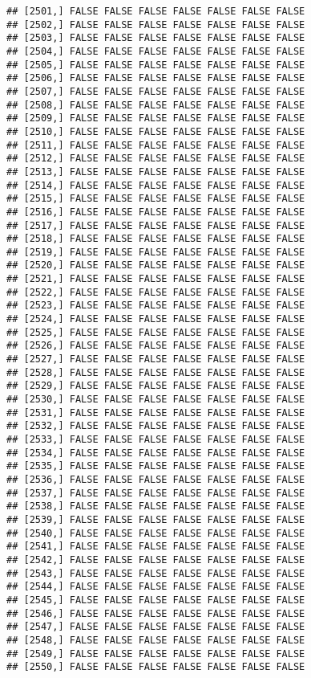\documentclass[
]{article}
\begin{document}
\begin{verbatim}
## [2501,] FALSE FALSE FALSE FALSE FALSE FALSE FALSE
## [2502,] FALSE FALSE FALSE FALSE FALSE FALSE FALSE
## [2503,] FALSE FALSE FALSE FALSE FALSE FALSE FALSE
## [2504,] FALSE FALSE FALSE FALSE FALSE FALSE FALSE
## [2505,] FALSE FALSE FALSE FALSE FALSE FALSE FALSE
## [2506,] FALSE FALSE FALSE FALSE FALSE FALSE FALSE
## [2507,] FALSE FALSE FALSE FALSE FALSE FALSE FALSE
## [2508,] FALSE FALSE FALSE FALSE FALSE FALSE FALSE
## [2509,] FALSE FALSE FALSE FALSE FALSE FALSE FALSE
## [2510,] FALSE FALSE FALSE FALSE FALSE FALSE FALSE
## [2511,] FALSE FALSE FALSE FALSE FALSE FALSE FALSE
## [2512,] FALSE FALSE FALSE FALSE FALSE FALSE FALSE
## [2513,] FALSE FALSE FALSE FALSE FALSE FALSE FALSE
## [2514,] FALSE FALSE FALSE FALSE FALSE FALSE FALSE
## [2515,] FALSE FALSE FALSE FALSE FALSE FALSE FALSE
## [2516,] FALSE FALSE FALSE FALSE FALSE FALSE FALSE
## [2517,] FALSE FALSE FALSE FALSE FALSE FALSE FALSE
## [2518,] FALSE FALSE FALSE FALSE FALSE FALSE FALSE
## [2519,] FALSE FALSE FALSE FALSE FALSE FALSE FALSE
## [2520,] FALSE FALSE FALSE FALSE FALSE FALSE FALSE
## [2521,] FALSE FALSE FALSE FALSE FALSE FALSE FALSE
## [2522,] FALSE FALSE FALSE FALSE FALSE FALSE FALSE
## [2523,] FALSE FALSE FALSE FALSE FALSE FALSE FALSE
## [2524,] FALSE FALSE FALSE FALSE FALSE FALSE FALSE
## [2525,] FALSE FALSE FALSE FALSE FALSE FALSE FALSE
## [2526,] FALSE FALSE FALSE FALSE FALSE FALSE FALSE
## [2527,] FALSE FALSE FALSE FALSE FALSE FALSE FALSE
## [2528,] FALSE FALSE FALSE FALSE FALSE FALSE FALSE
## [2529,] FALSE FALSE FALSE FALSE FALSE FALSE FALSE
## [2530,] FALSE FALSE FALSE FALSE FALSE FALSE FALSE
## [2531,] FALSE FALSE FALSE FALSE FALSE FALSE FALSE
## [2532,] FALSE FALSE FALSE FALSE FALSE FALSE FALSE
## [2533,] FALSE FALSE FALSE FALSE FALSE FALSE FALSE
## [2534,] FALSE FALSE FALSE FALSE FALSE FALSE FALSE
## [2535,] FALSE FALSE FALSE FALSE FALSE FALSE FALSE
## [2536,] FALSE FALSE FALSE FALSE FALSE FALSE FALSE
## [2537,] FALSE FALSE FALSE FALSE FALSE FALSE FALSE
## [2538,] FALSE FALSE FALSE FALSE FALSE FALSE FALSE
## [2539,] FALSE FALSE FALSE FALSE FALSE FALSE FALSE
## [2540,] FALSE FALSE FALSE FALSE FALSE FALSE FALSE
## [2541,] FALSE FALSE FALSE FALSE FALSE FALSE FALSE
## [2542,] FALSE FALSE FALSE FALSE FALSE FALSE FALSE
## [2543,] FALSE FALSE FALSE FALSE FALSE FALSE FALSE
## [2544,] FALSE FALSE FALSE FALSE FALSE FALSE FALSE
## [2545,] FALSE FALSE FALSE FALSE FALSE FALSE FALSE
## [2546,] FALSE FALSE FALSE FALSE FALSE FALSE FALSE
## [2547,] FALSE FALSE FALSE FALSE FALSE FALSE FALSE
## [2548,] FALSE FALSE FALSE FALSE FALSE FALSE FALSE
## [2549,] FALSE FALSE FALSE FALSE FALSE FALSE FALSE
## [2550,] FALSE FALSE FALSE FALSE FALSE FALSE FALSE

\end{verbatim}
\end{document}
